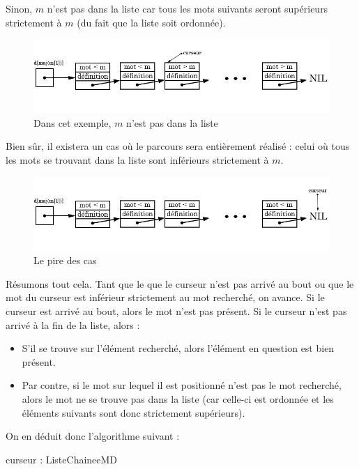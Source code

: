 \documentclass[a4paper, titlepage]{livret} %
\begin{document}
				Sinon, $m$ n'est pas dans la liste car tous les mots suivants seront supérieurs strictement à $m$ (du fait que la liste soit ordonnée).
				\begin{figure}[!ht]
				\centering
  					\includegraphics[scale=0.45]{estPresent4.png}
  					\caption{Dans cet exemple, $m$ n'est pas dans la liste} 
				\end{figure}

				Bien sûr, il existera un cas où le parcours sera entièrement réalisé : celui où tous les mots se trouvant dans la liste sont inférieurs strictement à $m$.
				\begin{figure}[!ht]
				\centering
  					\includegraphics[scale=0.45]{estPresent5.png}
  					\caption{Le pire des cas} 
				\end{figure}

				Résumons tout cela.
				Tant que le que le curseur n'est pas arrivé au bout ou que le mot du curseur est inférieur strictement au mot recherché, on avance.
				Si le curseur est arrivé au bout, alors le mot n'est pas présent.
				Si le curseur n'est pas arrivé à la fin de la liste, alors :
				\begin{itemize}
					\item S'il se trouve sur l'élément recherché, alors l'élément en question est bien présent.
					\item Par contre, si le mot sur lequel il est positionné n'est pas le mot recherché, alors le mot ne se trouve pas dans la liste (car celle-ci est ordonnée et les éléments suivants sont donc strictement supérieurs).
				\end{itemize}

				On en déduit donc l'algorithme suivant :\\
				\begin{algorithme}
					{curseur : ListeChaineeMD}{
					}
				\end{algorithme}
\end{document}
